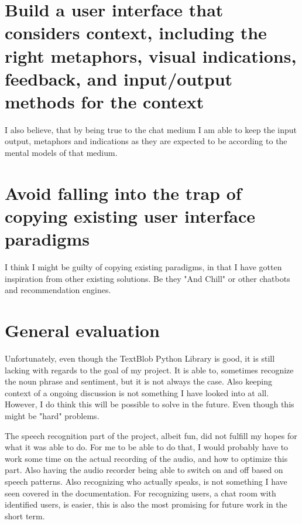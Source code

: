 \documentclass[11pt,fleqn]{book} %
\begin{document}
\section{Build a user interface that considers context, including the right metaphors,
visual indications, feedback, and input/output methods for the context}
I also believe, that by being true to the chat medium I am able to keep the input output, metaphors and indications as they are expected to be according to the mental models of that medium.

\section{Avoid falling into the trap of copying existing user interface paradigms}
I think I might be guilty of copying existing paradigms, in that I have gotten inspiration from other existing solutions. Be they "And Chill"\cite{Williams2016TheUK} or other chatbots and recommendation engines.

\section{General evaluation}
Unfortunately, even though the TextBlob\cite{TextBlobTutorial:Documentation} Python Library is good, it is still lacking with regards to the goal of my project.
It is able to, sometimes recognize the noun phrase and sentiment, but it is not always the case.
Also keeping context of a ongoing discussion is not something I have looked into at all.
However, I do think this will be possible to solve in the future.
Even though this might be "hard" problems.

The speech recognition part of the project, albeit fun, did not fulfill my hopes for what it was able to do. For me to be able to do that, I would probably have to work some time on the actual recording of the audio, and how to optimize this part. Also having the audio recorder being able to switch on and off based on speech patterns.
Also recognizing who actually speaks, is not something I have seen covered in the documentation.
For recognizing users, a chat room with identified users, is easier, this is also the most promising for future work in the short term.


\end{document}
